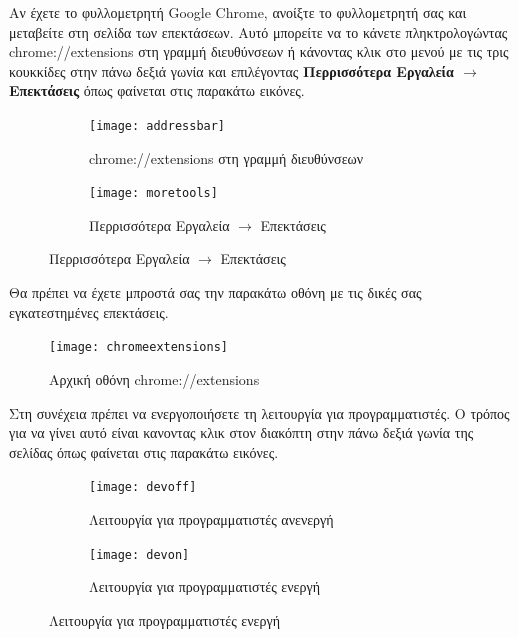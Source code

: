 \documentclass{article}
\begin{document}
Αν έχετε το φυλλομετρητή Google Chrome, ανοίξτε το φυλλομετρητή σας και μεταβείτε στη σελίδα των επεκτάσεων. Αυτό μπορείτε να το κάνετε πληκτρολογώντας chrome://extensions στη γραμμή διευθύνσεων ή κάνοντας κλικ στο μενού με τις τρις κουκκίδες στην πάνω δεξιά γωνία και επιλέγοντας \textbf{Περρισσότερα Εργαλεία $\rightarrow$ Επεκτάσεις} όπως φαίνεται στις παρακάτω εικόνες. 

\begin{figure}[H]
    \centering
    \begin{minipage}[t]{0.45\textwidth}
        \centering
        \begin{subfigure}[t]{\textwidth}
            \texttt{[image: addressbar]}
            \caption{chrome://extensions στη γραμμή διευθύνσεων}
            \label{Fig:addressbar}
        \end{subfigure}
        \vspace{\fill}
    \end{minipage}
    \hfill
    \begin{minipage}{0.45\textwidth}
        \begin{subfigure}{\textwidth}
            \texttt{[image: moretools]}
            \caption{Περρισσότερα Εργαλεία $\rightarrow$ Επεκτάσεις}
            \label{Fig:moretools}
        \end{subfigure}
    \end{minipage}
\end{figure}

Θα πρέπει να έχετε μπροστά σας την παρακάτω οθόνη με τις δικές σας εγκατεστημένες επεκτάσεις.

\begin{figure}[H]
    \texttt{[image: chromeextensions]}
    \caption*{Αρχική οθόνη chrome://extensions}
\end{figure}

Στη συνέχεια πρέπει να ενεργοποιήσετε τη λειτουργία για προγραμματιστές. Ο τρόπος για να γίνει αυτό είναι κανοντας κλικ στον διακόπτη στην πάνω δεξιά γωνία της σελίδας όπως φαίνεται στις παρακάτω εικόνες.
\begin{figure}[H]
    \centering
    \begin{subfigure}{0.45\textwidth}
        \texttt{[image: devoff]}
        \caption{Λειτουργία για προγραμματιστές ανενεργή}
        \label{Fig:devoff}
    \end{subfigure}
    \hfill
    \begin{subfigure}{0.45\textwidth}
        \texttt{[image: devon]}
        \caption{Λειτουργία για προγραμματιστές ενεργή}
        \label{Fig:devon}
    \end{subfigure}
\end{figure}
\end{document}
